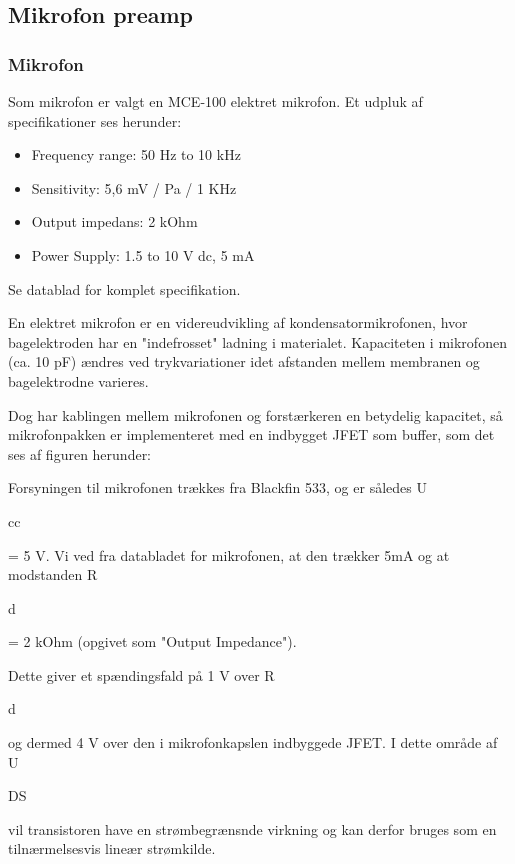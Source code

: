 
\subsection{Mikrofon preamp}

\subsubsection{Mikrofon} 
Som mikrofon er valgt en MCE-100 elektret mikrofon. Et udpluk af specifikationer ses herunder:
\begin{itemize}
	\item Frequency range: 50 Hz to 10 kHz
	\item Sensitivity: 5,6 mV / Pa / 1 KHz
	\item Output impedans: 2 kOhm
	\item Power Supply: 1.5 to 10 V dc, 5 mA
\end{itemize}
Se datablad for komplet specifikation. 

En elektret mikrofon er en videreudvikling af kondensatormikrofonen, hvor bagelektroden har en "indefrosset" ladning i materialet. Kapaciteten i mikrofonen (ca. 10 pF) ændres ved trykvariationer idet afstanden mellem membranen og bagelektrodne varieres. 


Dog har kablingen mellem mikrofonen og forstærkeren en betydelig kapacitet, så mikrofonpakken er implementeret med en indbygget JFET som buffer, som det ses af figuren herunder:

Forsyningen til mikrofonen trækkes fra Blackfin 533, og er således U\begin{tiny}cc\end{tiny} = 5 V. 
Vi ved fra databladet for mikrofonen, at den trækker 5mA og at modstanden R\begin{tiny}d\end{tiny} = 2 kOhm (opgivet som "Output Impedance").

Dette giver et spændingsfald på 1 V over R\begin{tiny}d\end{tiny} og dermed 4 V over den i mikrofonkapslen indbyggede JFET. I dette område af U\begin{tiny}DS\end{tiny} vil transistoren have en strømbegrænsnde virkning og kan derfor bruges som en tilnærmelsesvis lineær strømkilde.

